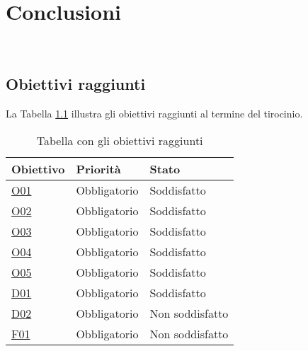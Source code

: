\chapter{Conclusioni}
\label{cap:conclusioni}

\\

\section{Obiettivi raggiunti}
\label{sec:raggiungimento-obiettivi}

La Tabella \ref{tab:obbiettivi-raggiunti} illustra gli obiettivi raggiunti al termine del tirocinio.

\begin{table}
    \centering
    \begin{tabular}{|l|l|l|}
        \hline
        \textbf{Obiettivo} & \textbf{Priorità} & \textbf{Stato} \\ \hline
        \hyperref[O01]{O01}                & Obbligatorio      & Soddisfatto    \\ \hline
        \hyperref[O02]{O02}                & Obbligatorio      & Soddisfatto    \\ \hline
        \hyperref[O03]{O03}                & Obbligatorio      & Soddisfatto    \\ \hline
        \hyperref[O04]{O04}                & Obbligatorio      & Soddisfatto    \\ \hline
        \hyperref[O05]{O05}                & Obbligatorio      & Soddisfatto    \\ \hline
        \hyperref[D01]{D01}                & Obbligatorio      & Soddisfatto    \\ \hline
        \hyperref[D02]{D02}                & Obbligatorio      & Non soddisfatto    \\ \hline
        \hyperref[F01]{F01}                & Obbligatorio      & Non soddisfatto    \\ \hline
    \end{tabular}%
\caption{Tabella con gli obiettivi raggiunti}
\label{tab:obbiettivi-raggiunti}
\end{table}

